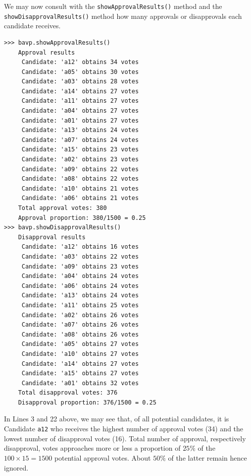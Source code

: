 We may now consult with the \texttt{showApprovalResults()} method and the \texttt{showDisapprovalResults()} method how many approvals or disapprovals each candidate receives.
\begin{lstlisting}
>>> bavp.showApprovalResults()
    Approval results
     Candidate: 'a12' obtains 34 votes
     Candidate: 'a05' obtains 30 votes
     Candidate: 'a03' obtains 28 votes
     Candidate: 'a14' obtains 27 votes
     Candidate: 'a11' obtains 27 votes
     Candidate: 'a04' obtains 27 votes
     Candidate: 'a01' obtains 27 votes
     Candidate: 'a13' obtains 24 votes
     Candidate: 'a07' obtains 24 votes
     Candidate: 'a15' obtains 23 votes
     Candidate: 'a02' obtains 23 votes
     Candidate: 'a09' obtains 22 votes
     Candidate: 'a08' obtains 22 votes
     Candidate: 'a10' obtains 21 votes
     Candidate: 'a06' obtains 21 votes
    Total approval votes: 380
    Approval proportion: 380/1500 = 0.25
>>> bavp.showDisapprovalResults()
    Disapproval results
     Candidate: 'a12' obtains 16 votes
     Candidate: 'a03' obtains 22 votes
     Candidate: 'a09' obtains 23 votes
     Candidate: 'a04' obtains 24 votes
     Candidate: 'a06' obtains 24 votes
     Candidate: 'a13' obtains 24 votes
     Candidate: 'a11' obtains 25 votes
     Candidate: 'a02' obtains 26 votes
     Candidate: 'a07' obtains 26 votes
     Candidate: 'a08' obtains 26 votes
     Candidate: 'a05' obtains 27 votes
     Candidate: 'a10' obtains 27 votes
     Candidate: 'a14' obtains 27 votes
     Candidate: 'a15' obtains 27 votes
     Candidate: 'a01' obtains 32 votes
    Total disapproval votes: 376
    Disapproval proportion: 376/1500 = 0.25
\end{lstlisting}
In Lines 3 and 22 above, we may see that, of all potential candidates, it is Candidate \texttt{a12} who receives the highest number of approval votes (34) and the lowest number of disapproval votes (16). Total number of approval, respectively disapproval, votes approaches more or less a proportion of $25\%$ of the $100 \times 15 = 1500$ potential approval votes. About $50\%$ of the latter remain hence ignored. 

